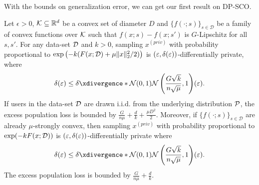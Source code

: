 With the bounds on generalization error, we can get our first result on DP-SCO.
\begin{theorem}[DP-SCO]
\label{thm:dpsco}
Let $\epsilon>0$, $\mathcal K\subseteq \mathbb{R}^d$ be a convex set of diameter $D$ and $\{f(\cdot;s)\}_{s\in\mathcal{D}}$ be a family of convex functions over $\mathcal K$ such that $f(x;s)-f(x;s')$ is $G$-Lipschitz for all $s,s'$.
For any data-set $\mathcal D$ and $k>0$, sampling $x^{(priv)}$ with probability proportional to $\exp\left(-k(F(x;\mathcal D)+\mu\|x\|_2^2/2)\right)$ is $(\varepsilon,\delta(\varepsilon))$-differentially private, where
\begin{align*}
 \delta(\eps)\leq \deltacurve{\cN(0,1)}{\cN\lp\frac{G\sqrt{k}}{n\sqrt{\mu}},1\rp}(\epsilon).
\end{align*}
If users in the data-set $\mathcal D$ are drawn i.i.d. from the underlying distribution $\mathcal P$, the excess population loss is bounded by $\frac{G}{n\mu}+\frac{d}{k}+\frac{\mu D^2}{2}$. 
Moreover, if $\{f(\cdot;s)\}_{s\in\mathcal{D}}$ are already $\mu$-strongly convex, then sampling 
$x^{(priv)}$ with probability proportional to $\exp(-kF(x;\mathcal D))$ is $(\varepsilon,\delta(\varepsilon))$-differentially private where 
\begin{align*}
 \delta(\eps)\leq \deltacurve{\cN(0,1)}{\cN\lp\frac{G\sqrt{k}}{n\sqrt{\mu}},1\rp}(\epsilon).
 \end{align*}
 The excess population loss is bounded by $\frac{G}{n\mu}+\frac{d}{k}$.
\end{theorem}

